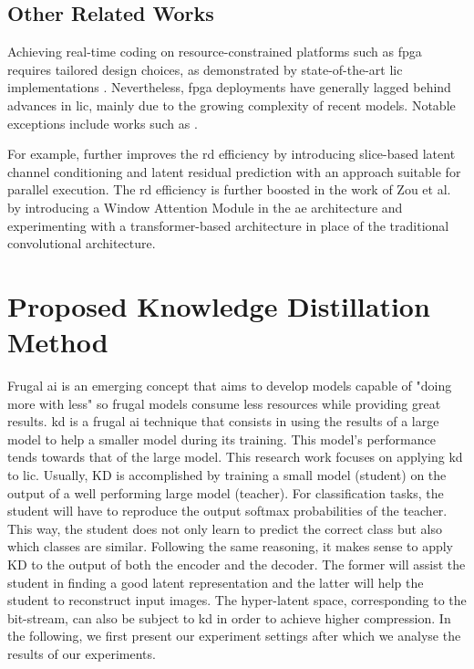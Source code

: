 \documentclass{article}
\begin{document}
\subsection{Other Related Works}
Achieving real-time coding on resource-constrained platforms such as \acrfull{fpga} requires tailored design choices, as demonstrated by state-of-the-art \acrshort{lic} implementations \cite{9745965, 10494759}. Nevertheless, \acrshort{fpga} deployments have generally lagged behind advances in \acrshort{lic}, mainly due to the growing complexity of recent models. Notable exceptions include works such as \cite{mazouz2025lightweight, mazouz2025security, sun2024fpga}.

For example, \cite{minnen2020channelwiseautoregressiveentropymodels} further improves the \acrshort{rd} efficiency by introducing slice-based latent channel conditioning and latent residual prediction with an approach suitable for parallel execution. The \acrshort{rd} efficiency is further boosted in the work of Zou et al. \cite{zou2022devildetailswindowbasedattention} by introducing a Window Attention Module in the \acrshort{ae} architecture and experimenting with a transformer-based architecture in place of the traditional convolutional architecture.

\section{Proposed Knowledge Distillation Method}
\label{proposed_method}
Frugal \acrshort{ai} is an emerging concept that aims to develop models capable of "doing more with less" so frugal models consume less resources while providing great results. \acrshort{kd} is a frugal \acrshort{ai} technique that consists in using the results of a large model to help a smaller model during its training. This model's performance tends towards that of the large model. This research work focuses on applying \acrshort{kd} to \acrshort{lic}. Usually, KD is accomplished by training a small model (student) on the output of a well performing large model (teacher). For classification tasks, the student will have to reproduce the output softmax probabilities of the teacher. This way, the student does not only learn to predict the correct class but also which classes are similar. Following the same reasoning, it makes sense to apply KD to the output of both the encoder and the decoder. The former will assist the student in finding a good latent representation and the latter will help the student to reconstruct input images. The hyper-latent space, corresponding to the bit-stream, can also be subject to \acrshort{kd} in order to achieve higher compression. In the following, we first present our experiment settings after which we analyse the results of our experiments.
\end{document}

